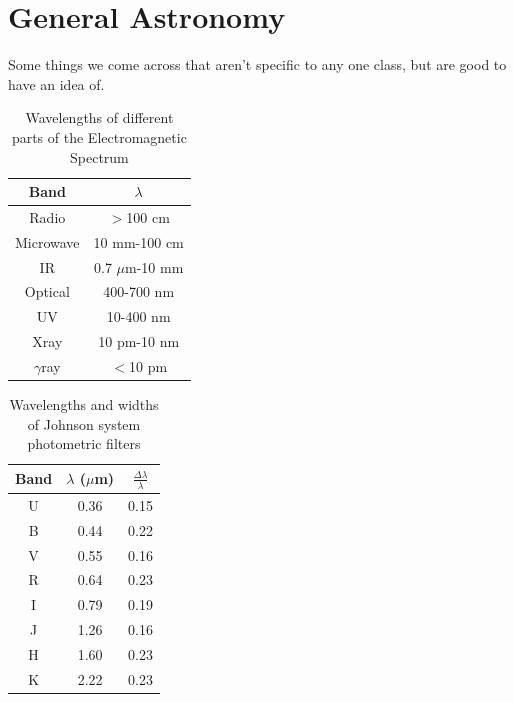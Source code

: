 \section{General Astronomy}
Some things we come across that aren't specific to any one class, but are 
good to have an idea of.

\begin{table}[H]
\centering
\begin{tabular}{c c}
\hline\hline
Band&$\lambda$\\
\hline
Radio&$>$100 cm\\
Microwave&10 mm-100 cm\\
IR&0.7 $\mu$m-10 mm\\
Optical&400-700 nm\\
UV&10-400 nm\\
Xray&10 pm-10 nm\\
$\gamma$ray&$<$10  pm\\
\hline\hline
\end{tabular}
\caption{Wavelengths of different parts of the Electromagnetic Spectrum}
\end{table}

\begin{table}[H]
\centering
\begin{tabular}{c c c}
\hline\hline
Band&$\lambda$ ($\mu$m)&$\frac{\Delta\lambda}{\lambda}$\\
\hline
U&0.36&0.15\\
B&0.44&0.22\\
V&0.55&0.16\\
R&0.64&0.23\\
I&0.79&0.19\\
J&1.26&0.16\\
H&1.60&0.23\\
K&2.22&0.23\\
\hline\hline
\end{tabular}
\caption{Wavelengths and widths of Johnson system photometric filters}
\end{table}

